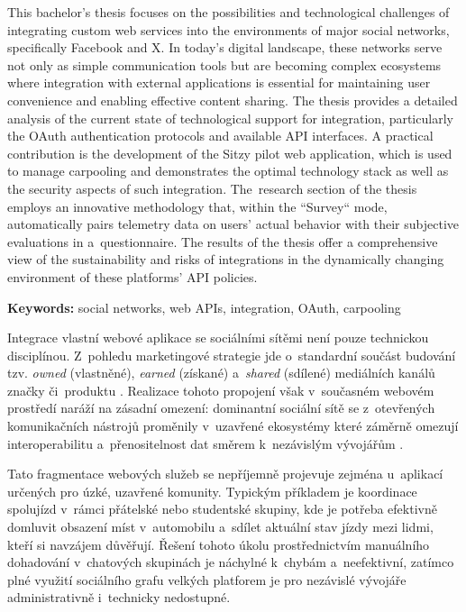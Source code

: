 \documentclass[male,czech,api_bc]{kitheses}
\begin{document}
This bachelor’s thesis focuses on the possibilities and technological challenges of integrating custom web services into the environments of major social networks, specifically Facebook and X. In today’s digital landscape, these networks serve not only as simple communication tools but are becoming complex ecosystems where integration with external applications is essential for maintaining user convenience and enabling effective content sharing. The thesis provides a detailed analysis of the current state of technological support for integration, particularly the OAuth authentication protocols and available API interfaces. A practical contribution is the development of the Sitzy pilot web application, which is used to manage carpooling and demonstrates the optimal technology stack as well as the security aspects of such integration. The~research section of the thesis employs an innovative methodology that, within the ``Survey``  mode, automatically pairs telemetry data on users’ actual behavior with their subjective evaluations in a~questionnaire. The results of the thesis offer a comprehensive view of the sustainability and risks of integrations in the dynamically changing environment of these platforms’ API policies.

\textbf{Keywords:} social networks, web APIs, integration, OAuth, carpooling

\tableofcontents


Integrace vlastní webové aplikace se sociálními sítěmi není pouze technickou disciplínou. Z~pohledu marketingové strategie jde o~standardní součást budování tzv. \textit{owned} (vlastněné), \textit{earned} (získané) a~\textit{shared} (sdílené) mediálních kanálů značky či~produktu \cite{Quesenberry2024}. Realizace tohoto propojení však v~současném webovém prostředí naráží na zásadní omezení: dominantní sociální sítě se z~otevřených komunikačních nástrojů proměnily v~uzavřené ekosystémy které záměrně omezují interoperabilitu a~přenositelnost dat směrem k~nezávislým vývojářům \cite{Marro2025,DeNardis2015}.

Tato fragmentace webových služeb se nepříjemně projevuje zejména u~aplikací určených pro úzké, uzavřené komunity. Typickým příkladem je koordinace spolujízd v~rámci přátelské nebo studentské skupiny, kde je potřeba efektivně domluvit obsazení míst v~automobilu a~sdílet aktuální stav jízdy mezi lidmi, kteří si navzájem důvěřují. Řešení tohoto úkolu prostřednictvím manuálního dohadování v~chatových skupinách je náchylné k~chybám a~neefektivní, zatímco plné využití sociálního grafu velkých platforem je pro nezávislé vývojáře administrativně i~technicky nedostupné.
\end{document}
